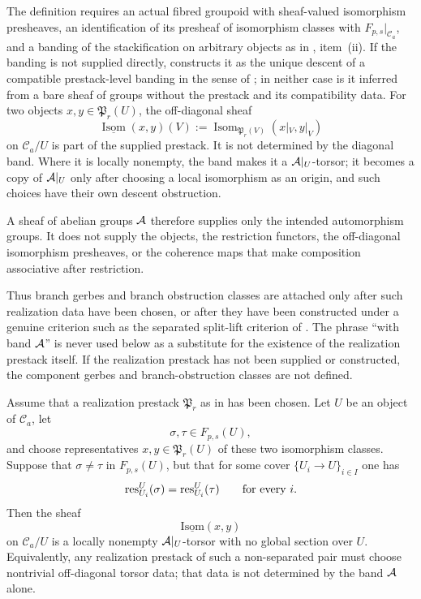 \begin{remark}\label{rem:realization-data-hypothesis}
The definition requires an actual fibred groupoid with sheaf-valued isomorphism presheaves, an identification of its presheaf of isomorphism classes with $F_{p,s}|_{\mathcal C_a}$, and a banding of the stackification on arbitrary objects as in , item~\textup{(ii)}. If the banding is not supplied directly,  constructs it as the unique descent of a compatible prestack-level banding in the sense of ; in neither case is it inferred from a bare sheaf of groups without the prestack and its compatibility data. For two objects $x,y\in\mathfrak P_r(U)$, the off-diagonal sheaf
\[
\underline{\operatorname{Isom}}(x,y)(V)
:=
\operatorname{Isom}_{\mathfrak P_r(V)}
(x|_V,y|_V)
\]
on $\mathcal C_a/U$ is part of the supplied prestack. It is not determined by the diagonal band. Where it is locally nonempty, the band makes it a $\mathcal{A}|_U$-torsor; it becomes a copy of $\mathcal{A}|_U$ only after choosing a local isomorphism as an origin, and such choices have their own descent obstruction.

A sheaf of abelian groups $\mathcal{A}$ therefore supplies only the intended automorphism groups. It does not supply the objects, the restriction functors, the off-diagonal isomorphism presheaves, or the coherence maps that make composition associative after restriction.

Thus branch gerbes and branch obstruction classes are attached only after such realization data have been chosen, or after they have been constructed under a genuine criterion such as the separated split-lift criterion of . The phrase ``with band $\mathcal{A}$'' is never used below as a substitute for the existence of the realization prestack itself. If the realization prestack has not been supplied or constructed, the component gerbes and branch-obstruction classes are not defined.
\end{remark}

\begin{lemma}\label{lem:nonseparated-pairs-need-torsors}
Assume that a realization prestack $\mathfrak P_r$ as in  has been chosen. Let $U$ be an object of $\mathcal C_a$, let
\[
\sigma,\tau\in F_{p,s}(U),
\]
and choose representatives $x,y\in \mathfrak P_r(U)$ of these two isomorphism classes. Suppose that $\sigma\neq\tau$ in $F_{p,s}(U)$, but that for some cover $\{U_i\to U\}_{i\in I}$ one has
\[
\mathrm{res}_{U_i}^{U}(\sigma)=\mathrm{res}_{U_i}^{U}(\tau)
\qquad\text{for every }i.
\]
Then the sheaf
\[
\underline{\mathrm{Isom}}(x,y)
\]
on $\mathcal C_a/U$ is a locally nonempty $\mathcal{A}|_U$-torsor with no global section over $U$. Equivalently, any realization prestack of such a non-separated pair must choose nontrivial off-diagonal torsor data; that data is not determined by the band $\mathcal{A}$ alone.
\end{lemma}

